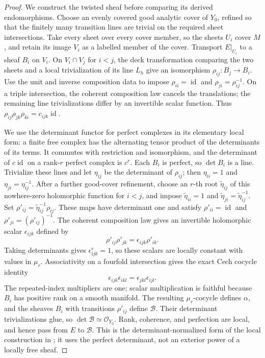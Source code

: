 \documentclass[11pt]{article}
\numberwithin{equation}{section}
\begin{document}
\begin{proof}
We construct the twisted sheaf before comparing its derived
endomorphisms.  Choose an evenly covered good analytic cover of \(Y_0\),
refined so that the finitely many transition lines are trivial on the
required sheet intersections.  Take every sheet over every cover member,
so the sheets \(U_i\) cover \(M\), and retain its image \(V_i\) as a
labelled member of the cover.  Transport
\(E|_{U_i}\) to a sheaf \(B_i\) on \(V_i\).  On \(V_i\cap V_j\) for
\(i<j\), the deck transformation comparing the two sheets and a local
trivialization of its line \(L_h\) give an isomorphism
\(\rho_{ij}:B_j\to B_i\).  Use the unit and inverse composition data
to impose \(\rho_{ii}=\operatorname{id}\) and
\(\rho_{ji}=\rho_{ij}^{-1}\).  On a triple intersection, the coherent
composition law cancels the translations; the remaining line
trivializations differ by an invertible scalar function.  Thus
\(\rho_{ij}\rho_{jk}\rho_{ki}=c_{ijk}\operatorname{id}\).

We use the determinant functor for perfect complexes in its elementary
local form: a finite free complex has the alternating tensor product of
the determinants of its terms.  It commutes with restriction and
isomorphism, and the determinant of \(c\operatorname{id}\) on a
rank-\(r\) perfect complex is \(c^r\).  Each \(B_i\) is perfect, so
\(\det B_i\) is a line.  Trivialize these lines and let \(\eta_{ij}\)
be the determinant of \(\rho_{ij}\); then \(\eta_{ii}=1\) and
\(\eta_{ji}=\eta_{ij}^{-1}\).  After a further good-cover refinement,
choose an \(r\)-th root \(\widetilde\eta_{ij}\) of this nowhere-zero
holomorphic function for \(i<j\), and impose
\(\widetilde\eta_{ii}=1\) and
\(\widetilde\eta_{ji}=\widetilde\eta_{ij}^{-1}\).  Set
\(\rho'_{ij}=\widetilde\eta_{ij}^{-1}\rho_{ij}\).  These maps have
determinant one and satisfy \(\rho'_{ii}=\operatorname{id}\) and
\(\rho'_{ji}=(\rho'_{ij})^{-1}\).  The coherent composition law gives
an invertible holomorphic scalar \(\epsilon_{ijk}\) defined by
\[
 \rho'_{ij}\rho'_{jk}=\epsilon_{ijk}\rho'_{ik}.
\]
Taking determinants gives \(\epsilon_{ijk}^r=1\), so these scalars are
locally constant with values in \(\mu_r\).  Associativity on a fourfold
intersection gives the exact Cech cocycle identity
\[
 \epsilon_{ijk}\epsilon_{ikl}=\epsilon_{jkl}\epsilon_{ijl}.
\]
The repeated-index multipliers are one; scalar multiplication is
faithful because \(B_i\) has positive rank on a smooth manifold.
The resulting \(\mu_r\)-cocycle defines \(\alpha\), and the sheaves
\(B_i\) with transitions \(\rho'_{ij}\) define \(\mathcal B\).
Their determinant trivializations glue, so
\(\det\mathcal B\simeq\mathcal O_{Y_0}\).  Rank, coherence, and
perfection are local, and hence pass from \(E\) to \(\mathcal B\).
This is the determinant-normalized form of the local construction in
\cite[Lemma~9.3.6 and equation~(9.3.3)]{Markman2025Secant};
it uses the perfect determinant, not an exterior power of a locally
free sheaf.


\end{proof}
\end{document}

